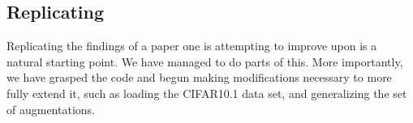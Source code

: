 \documentclass[10pt,twocolumn,letterpaper]{article}
\begin{document}

	
	

\subsection{Replicating \cite{Cubuk2018}}
	Replicating the findings of a paper one is attempting to improve upon is a natural starting point. We have managed to do parts of this. More importantly, we have grasped the code and begun making modifications necessary to more fully extend it, such as loading the CIFAR10.1 data set, and generalizing the set of augmentations.

\end{document}
